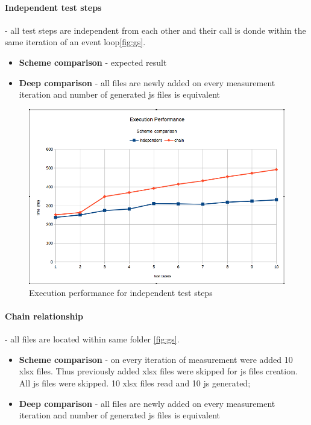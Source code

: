 \paragraph{Independent test steps} - all test steps are independent from each other and their call is donde within the same iteration of an event loop\ref{fig:gs}.
\begin{itemize}
	\item \textbf{Scheme comparison} - expected result
	\item \textbf{Deep comparison} - all files are newly added on every measurement iteration and number of generated js files is equivalent
\end{itemize}
\begin{figure}[ht]
	\label{fig:ei}
	\centering
	\includegraphics[width=\textwidth]{grafiken/exec_scheme}
	\caption{Execution performance for independent test steps}
\end{figure}

\paragraph{Chain relationship} - all files are located within same folder \ref{fig:gs}.
\begin{itemize}
	\item \textbf{Scheme comparison} - on every iteration of measurement were added 10 xlsx files. Thus previously added xlsx files were skipped for js files creation. All js files were skipped. 10 xlsx files read and 10 js generated;
	\item \textbf{Deep comparison} - all files are newly added on every measurement iteration and number of generated js files is equivalent
\end{itemize}

